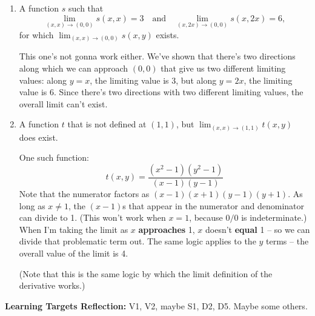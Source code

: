 \begin{enumerate}[leftmargin=0pt]
\begin{enumerate}
        \item A function $s$ such that 
        \[\lim_{(x, x) \to (0, 0)} s(x, x) = 3 \quad \textrm{and} \quad
        \lim_{(x, 2x) \to (0, 0)} s(x, 2x) = 6,\]
        for which $\lim_{(x, x) \to (0, 0)} s(x, y)$ exists.
        
        \begin{red}
            This one's not gonna work either. We've shown that there's two directions along which we can approach $(0, 0)$ that give us two different limiting values: along $y=x$, the limiting value is 3, but along $y=2x$, the limiting value is 6. Since there's two directions with two different limiting values, the overall limit can't exist.
        \end{red}
        
        \item A function $t$ that is not defined at $(1, 1)$, but $\lim_{(x, x) \to (1, 1)} t(x, y)$ does exist.
        
        \begin{red}
            One such function:
            \[t(x, y) = \frac{(x^2-1)(y^2-1)}{(x-1)(y-1)}\]
            Note that the numerator factors as $(x-1)(x+1)(y-1)(y+1)$. As long as $x\neq 1$, the $(x-1)$s that appear in the numerator and denominator can divide to 1. (This won't work when $x=1$, because $0/0$ is indeterminate.) When I'm taking the limit as $x$ \textbf{approaches} 1, $x$ doesn't \textbf{equal} 1 -- so we can divide that problematic term out. The same logic applies to the $y$ terms -- the overall value of the limit is 4.
            
            (Note that this is the same logic by which the limit definition of the derivative works.)
        \end{red}
    
    \end{enumerate}

\end{enumerate}

\begin{red}
\textbf{Learning Targets Reflection:} V1, V2, maybe S1, D2, D5. Maybe some others.
\end{red}

